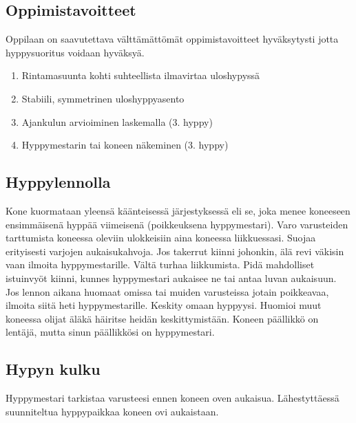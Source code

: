 \subsection{ Oppimistavoitteet }
\label{pl-alkeiskoulutuksen-suoritukset-oppimistavoitteet}


Oppilaan on saavutettava välttämättömät oppimistavoitteet hyväksytysti jotta hyppysuoritus voidaan hyväksyä. 

\begin{enumerate}[label=\bfseries \arabic*)]
\item  Rintamasuunta kohti suhteellista ilmavirtaa uloshypyssä 
\item  Stabiili, symmetrinen uloshyppyasento 
\item  Ajankulun arvioiminen laskemalla (3. hyppy) 
\item  Hyppymestarin tai koneen näkeminen (3. hyppy)  
\end{enumerate}
\subsection{ Hyppylennolla }
\label{pl-alkeiskoulutuksen-suoritukset-hyppylennolla}


Kone kuormataan yleensä käänteisessä järjestyksessä eli se, joka menee koneeseen ensimmäisenä hyppää viimeisenä (poikkeuksena hyppymestari). Varo varusteiden tarttumista koneessa oleviin ulokkeisiin aina koneessa liikkuessasi. Suojaa erityisesti varjojen aukaisukahvoja. Jos takerrut kiinni johonkin, älä revi väkisin vaan ilmoita hyppymestarille. Vältä turhaa liikkumista. Pidä mahdolliset istuinvyöt kiinni, kunnes hyppymestari aukaisee ne tai antaa luvan aukaisuun. Jos lennon aikana huomaat omissa tai muiden varusteissa jotain poikkeavaa, ilmoita siitä heti hyppymestarille. Keskity omaan hyppyysi. Huomioi muut koneessa olijat äläkä häiritse heidän keskittymistään. Koneen päällikkö on lentäjä, mutta sinun päällikkösi on hyppymestari. 

\subsection{ Hypyn kulku }
\label{pl-alkeiskoulutuksen-suoritukset-hypyn-kulku}


Hyppymestari tarkistaa varusteesi ennen koneen oven aukaisua. Lähestyttäessä suunniteltua hyppypaikkaa koneen ovi aukaistaan. 

